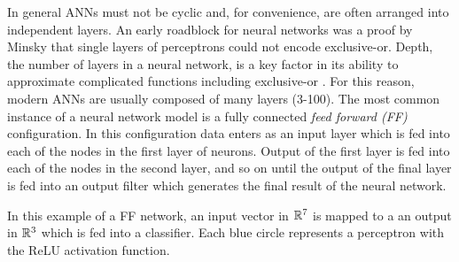 

In general ANNs 
must not be cyclic and, for convenience, are often arranged into
independent layers. An early roadblock for neural networks was a proof by Minsky \cite{minsky1969perceptrons} that single layers of perceptrons could not encode exclusive-or. Depth, the number of layers in a neural network, is a key factor in its ability to approximate complicated functions including exclusive-or \cite{kak1993training}. For this reason, modern ANNs are usually composed of many layers (3-100). The most common instance of a neural network model is a fully connected \emph{feed forward (FF)} configuration. In this configuration data enters as an input layer which is fed into each of the nodes in the first layer of neurons. Output of the first layer is fed into each of the nodes in the second layer, and so on until the output of the final layer is fed into an output filter which generates the final result of the neural network. 




In this example of a FF network, an input vector in $\mathbb{R}^7$ is mapped to a
an output in $\mathbb{R}^3$ which is fed into a classifier. Each blue circle
represents a perceptron with the ReLU activation function. 


